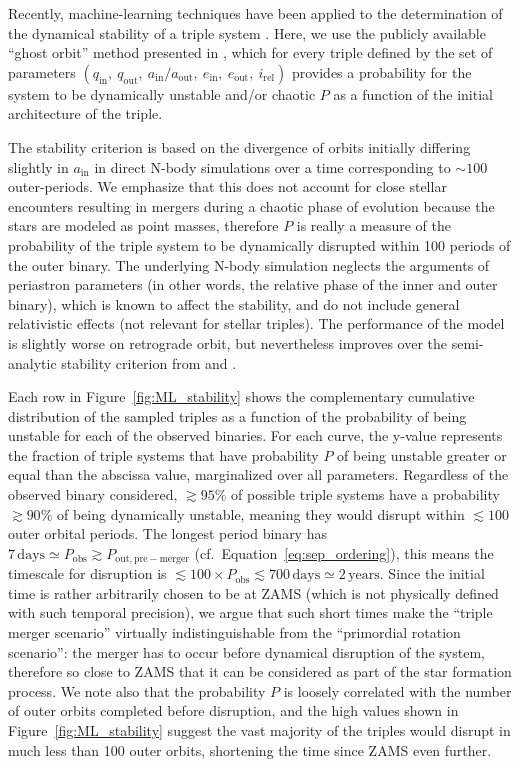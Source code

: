 \documentclass{aa}
\DeclareRobustCommand{\Eqref}[1]{Equation~\ref{#1}}
\DeclareRobustCommand{\Figref}[1]{Figure~\ref{#1}}
\begin{document}
 Recently, machine-learning techniques have been applied to the
 determination of the dynamical stability of a triple system
 \citep[e.g.,][]{lalande:22, vynatheya:22, vynatheya:23}. Here, we use the
 publicly available ``ghost orbit'' method presented in
 \cite{vynatheya:23}, which for every triple defined by the set of
 parameters
 $(q_\mathrm{in},\ q_\mathrm{out},\ a_\mathrm{in}/a_\mathrm{out},\ e_\mathrm{in},\ e_\mathrm{out},\ i_\mathrm{rel})$
 provides a probability for the system to be dynamically unstable
 and/or chaotic $P$ as a function of the initial architecture of the
 triple.

 The stability criterion is based on the divergence of orbits initially
 differing slightly in $a_\mathrm{in}$ in direct N-body simulations
 over a time corresponding to $\sim 100$ outer-periods. We emphasize
 that this does not account for close stellar encounters resulting
 in mergers during a chaotic phase of evolution because the stars are
 modeled as point masses, therefore $P$ is really a measure of the
 probability of the triple system to be dynamically disrupted within
 100 periods of the outer binary. The underlying N-body simulation
 neglects the arguments of periastron parameters (in other words, the
 relative phase of the inner and outer binary), which is known to
 affect the stability, and do not include general relativistic effects
 (not relevant for stellar triples). The performance of the model is
 slightly worse on retrograde orbit, but nevertheless improves over
 the semi-analytic stability criterion from \cite{mardling:99} and
 \cite{vynatheya:22}.

 Each row in \Figref{fig:ML_stability} shows the complementary
 cumulative distribution of the sampled triples as a function of the
 probability of being unstable for each of the observed binaries. For
 each curve, the y-value represents the fraction of triple systems
 that have probability $P$ of being unstable greater or equal than the
 abscissa value, marginalized over all parameters. Regardless of the
 observed binary considered, $\gtrsim 95\%$ of possible triple systems
 have a probability $\gtrsim 90\%$ of being dynamically unstable,
 meaning they would disrupt within $\lesssim100$ outer orbital periods.
 The longest period binary has
 $7\,\mathrm{days}\simeq P_\mathrm{obs}\gtrsim P_\mathrm{out, pre-merger}$
 (cf.~\Eqref{eq:sep_ordering}), this means the timescale for
 disruption is
 $\lesssim 100\times P_\mathrm{obs} \lesssim 700\,\mathrm{days}\simeq 2\,\mathrm{years}$.
 Since the initial time is rather arbitrarily chosen to be at ZAMS
 (which is not physically defined with such temporal precision), we
 argue that such short times make the ``triple merger scenario''
 virtually indistinguishable from the ``primordial rotation
 scenario'': the merger has to occur before dynamical disruption of
 the system, therefore so close to ZAMS that it can be considered as
 part of the star formation process. We note also that the probability
 $P$ is loosely correlated with the number of outer orbits completed
 before disruption, and the high values shown in
 \Figref{fig:ML_stability} suggest the vast majority of the triples
 would disrupt in much less than 100 outer orbits, shortening the time
 since ZAMS even further.
\end{document}
